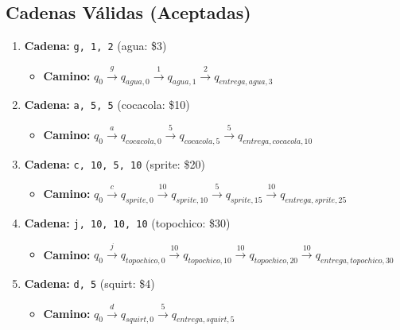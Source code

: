 \documentclass{article}
\begin{document}
\subsection{Cadenas Válidas (Aceptadas)}
\begin{enumerate}
    \item \textbf{Cadena:} \texttt{g, 1, 2} (agua: \$3)
    \begin{itemize}
        \item \textbf{Camino:} $q_0 \xrightarrow{g} q_{agua, 0} \xrightarrow{1} q_{agua, 1} \xrightarrow{2} q_{entrega, agua, 3}$
    \end{itemize}
    \item \textbf{Cadena:} \texttt{a, 5, 5} (cocacola: \$10)
    \begin{itemize}
        \item \textbf{Camino:} $q_0 \xrightarrow{a} q_{cocacola, 0} \xrightarrow{5} q_{cocacola, 5} \xrightarrow{5} q_{entrega, cocacola, 10}$
    \end{itemize}
    \item \textbf{Cadena:} \texttt{c, 10, 5, 10} (sprite: \$20)
    \begin{itemize}
        \item \textbf{Camino:} $q_0 \xrightarrow{c} q_{sprite, 0} \xrightarrow{10} q_{sprite, 10} \xrightarrow{5} q_{sprite, 15} \xrightarrow{10} q_{entrega, sprite, 25}$
    \end{itemize}
    \item \textbf{Cadena:} \texttt{j, 10, 10, 10} (topochico: \$30)
    \begin{itemize}
        \item \textbf{Camino:} $q_0 \xrightarrow{j} q_{topochico, 0} \xrightarrow{10} q_{topochico, 10} \xrightarrow{10} q_{topochico, 20} \xrightarrow{10} q_{entrega, topochico, 30}$
    \end{itemize}
    \item \textbf{Cadena:} \texttt{d, 5} (squirt: \$4)
    \begin{itemize}
        \item \textbf{Camino:} $q_0 \xrightarrow{d} q_{squirt, 0} \xrightarrow{5} q_{entrega, squirt, 5}$
    \end{itemize}
\end{enumerate}
\end{document}
